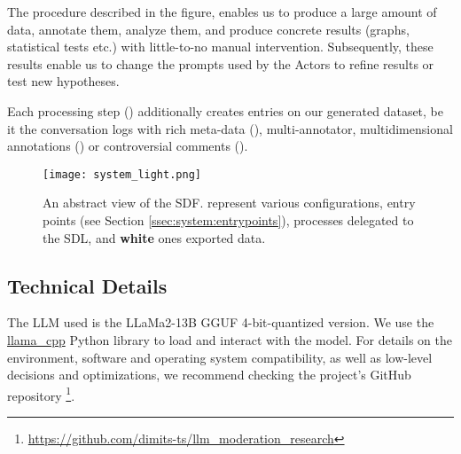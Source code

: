 The procedure described in the figure, enables us to produce a large amount of data, annotate them, analyze them, and produce concrete results (graphs, statistical tests etc.) with little-to-no manual intervention. Subsequently, these results enable us to change the prompts used by the Actors to refine results or test new hypotheses.

Each processing step () additionally creates entries on our generated dataset, be it the conversation logs with rich meta-data (), multi-annotator, multidimensional annotations () or controversial comments ().

\begin{figure}
	\centering
	\texttt{[image: system\_light.png]}
	\caption{An abstract view of the \ac{SDF}.  represent various configurations,  entry points (see Section \ref{ssec:system:entrypoints}),  processes delegated to the \ac{SDL}, and \textbf{white} ones exported data.}
	\label{fig::system}
\end{figure}



\subsection{Technical Details}
\label{ssec:system:details}

The LLM used is the LLaMa2-13B GGUF 4-bit-quantized version. We use the \href{https://github.com/abetlen/llama-cpp-python}{llama\_cpp} Python library to load and interact with the model. For details on the environment, software and operating system compatibility, as well as low-level decisions and optimizations, we recommend checking the project's GitHub repository \footnote{\url{https://github.com/dimits-ts/llm_moderation_research}}.

